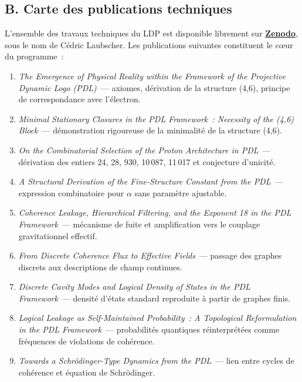 \documentclass[12pt, a4paper, openright]{book}
\begin{document}
\subsection*{B. Carte des publications techniques}

L'ensemble des travaux techniques du LDP est disponible librement sur \href{https://zenodo.org}{\textbf{Zenodo}}, sous le nom de Cédric Laubscher. Les publications suivantes constituent le c\oe{}ur du programme~:

\begin{enumerate}

\item \textit{The Emergence of Physical Reality within the Framework of the Projective Dynamic Logo (PDL)}~--- axiomes, dérivation de la structure (4,6), principe de correspondance avec l'électron.

\item \textit{Minimal Stationary Closures in the PDL Framework~: Necessity of the (4,6) Block}~--- démonstration rigoureuse de la minimalité de la structure (4,6).

\item \textit{On the Combinatorial Selection of the Proton Architecture in PDL}~--- dérivation des entiers 24, 28, 930, 10\,087, 11\,017 et conjecture d'unicité.

\item \textit{A Structural Derivation of the Fine-Structure Constant from the PDL}~--- expression combinatoire pour $\alpha$ sans paramètre ajustable.

\item \textit{Coherence Leakage, Hierarchical Filtering, and the Exponent 18 in the PDL Framework}~--- mécanisme de fuite et amplification vers le couplage gravitationnel effectif.

\item \textit{From Discrete Coherence Flux to Effective Fields}~--- passage des graphes discrets aux descriptions de champ continues.

\item \textit{Discrete Cavity Modes and Logical Density of States in the PDL Framework}~--- densité d'états standard reproduite à partir de graphes finis.

\item \textit{Logical Leakage as Self-Maintained Probability~: A Topological Reformulation in the PDL Framework}~--- probabilités quantiques réinterprétées comme fréquences de violations de cohérence.

\item \textit{Towards a Schrödinger-Type Dynamics from the PDL}~--- lien entre cycles de cohérence et équation de Schrödinger.


\end{enumerate}
\end{document}
